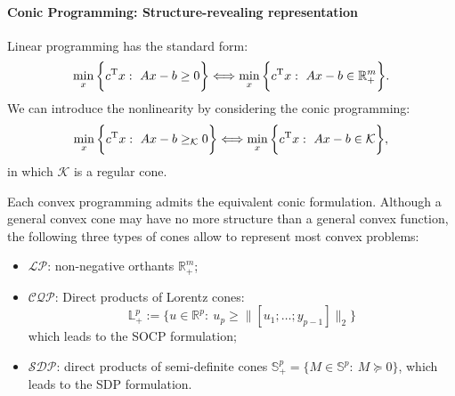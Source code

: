 \paragraph{Conic Programming: Structure-revealing representation}
Linear programming has the standard form:
\[
\min_{x}\bigg\{
c^{\mathrm T} x:~Ax-b\ge0
\bigg\}
\Longleftrightarrow
\min_{x}\bigg\{
c^{\mathrm T} x:~Ax-b\in\mathbb{R}_+^m
\bigg\}.
\]
We can introduce the nonlinearity by considering  the conic programming:
\[
\min_{x}\bigg\{
c^{\mathrm T} x:~Ax-b\ge_{\mathcal{K}}0
\bigg\}
\Longleftrightarrow
\min_{x}\bigg\{
c^{\mathrm T} x:~Ax-b\in\mathcal{K}
\bigg\},
\]
in which $\mathcal{K}$ is a regular cone.
\begin{remark}
Each convex programming admits the equivalent conic formulation.
Although a general convex cone may have no more structure than a general convex function, the following three types of cones allow to represent most convex problems:
\begin{itemize}
\item
$\mathcal{LP}$: non-negative orthants $\mathbb{R}_+^m$;
\item
$\mathcal{CQP}$: Direct products of Lorentz cones:
\[
\mathbb{L}_+^p:=
\{
u\in\mathbb{R}^p:~u_p\ge \|[u_1;\ldots;y_{p-1}]\|_2
\}
\]
which leads to the SOCP formulation;
\item
$\mathcal{SDP}$: direct products of semi-definite cones $\mathbb{S}_+^p=\{M\in\mathbb{S}^p:~M\succeq0\}$, which leads to the SDP formulation.
\end{itemize}
\end{remark}

